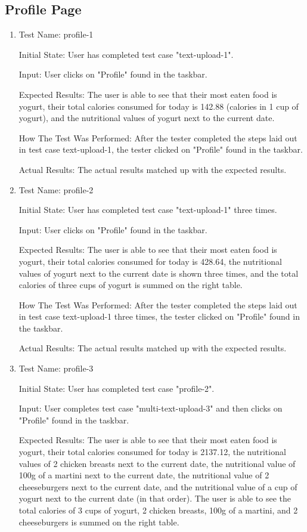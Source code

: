 \documentclass[12pt, titlepage]{article}
\begin{document}
	\subsection{Profile Page}
	\begin{enumerate}
		\item{Test Name: profile-1}
		
		Initial State: User has completed test case "text-upload-1".
		
		Input: User clicks on "Profile" found in the taskbar.
		
		Expected Results: The user is able to see that their most eaten food is yogurt, their total calories consumed for today is 142.88 (calories in 1 cup of yogurt), and the nutritional values of yogurt next to the current date.
		
		How The Test Was Performed: After the tester completed the steps laid out in test case text-upload-1, the tester clicked on "Profile" found in the taskbar.
		
		Actual Results: The actual results matched up with the expected results.
		
		\item{Test Name: profile-2}
		
		Initial State: User has completed test case "text-upload-1" three times.
		
		Input: User clicks on "Profile" found in the taskbar.
		
		Expected Results: The user is able to see that their most eaten food is yogurt, their total calories consumed for today is 428.64, the nutritional values of yogurt next to the current date is shown three times, and the total calories of three cups of yogurt is summed on the right table.
		
		How The Test Was Performed: After the tester completed the steps laid out in test case text-upload-1 three times, the tester clicked on "Profile" found in the taskbar.
		
		Actual Results: The actual results matched up with the expected results.
		
		\item{Test Name: profile-3}
		
		Initial State: User has completed test case "profile-2".
		
		Input: User completes test case "multi-text-upload-3" and then clicks on "Profile" found in the taskbar.
		
		Expected Results: The user is able to see that their most eaten food is yogurt, their total calories consumed for today is 2137.12, the nutritional values of 2 chicken breasts next to the current date, the nutritional value of 100g of a martini next to the current date, the nutritional value of 2 cheeseburgers next to the current date, and the nutritional value of a cup of yogurt next to the current date (in that order). The user is able to see the total calories of 3 cups of yogurt, 2 chicken breasts, 100g of a martini, and 2 cheeseburgers is summed on the right table.
		

\end{enumerate}
\end{document}
